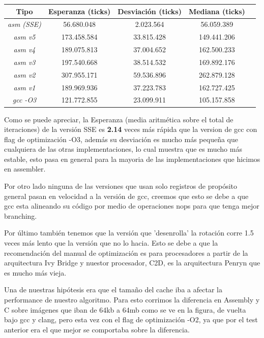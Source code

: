 \documentclass[a4paper]{article}
\begin{document}
\begin{center}
        \begin{tabular}[c]{|c|c|c|c|c|}
    \hline
        \textbf{Tipo} &  \textbf{Esperanza (ticks)} & \textbf{Desviación (ticks)} & \textbf{Mediana (ticks)}\\
        \hline
\textit{asm (SSE)} &    56.680.048  & 2.023.564 & 56.059.389\\
        \hline
\textit{asm v5} &   173.458.584    & 33.815.428 & 149.441.206\\
        \hline
\textit{asm v4} &   189.075.813    & 37.004.652 & 162.500.233 \\
        \hline
\textit{asm v3} &  197.540.668  & 38.514.532 & 169.892.176\\
        \hline
\textit{asm v2} &  307.955.171   & 59.536.896 & 262.879.128\\
        \hline
\textit{asm v1} &  189.969.936 & 37.223.783 & 162.727.425\\
        \hline
\textit{gcc -O3} &  121.772.855 & 23.099.911 & 105.157.858\\
        \hline
    \end{tabular}
\end{center}

Como se puede apreciar, la Esperanza (media aritmética sobre el total de iteraciones) de la versión SSE es \textbf{2.14} veces más rápida que la version de gcc con flag de optimización -O3, además su desviación es mucho más pequeña que cualquiera de las otras implementaciones, lo cual muestra que es mucho más estable, esto pasa en general para la mayoria de las implementaciones que hicimos en assembler.

Por otro lado ninguna de las versiones que usan solo registros de propósito general pasan en velocidad a la versión de gcc, creemos que esto se debe a que gcc esta alineando su código por medio de operaciones nops para que tenga mejor branching.

Por último también tenemos que la versión que 'desenrolla' la rotación corre 1.5 veces más lento que la versión que no lo hacia. Esto se debe a que la recomendación del manual de optimización es para procesadores a partir de la arquitectura Ivy Bridge y nuestor procesador, C2D, es la arquitectura Penryn que es mucho más vieja.
 \newline \hfill



Una de nuestras hipótesis era que el tamaño del cache iba a afectar la performance de nuestro algoritmo. Para esto corrimos la diferencia en Assembly y C sobre imágenes que iban de 64kb a 64mb como se ve en la figura, de vuelta bajo gcc y clang, pero esta vez con el flag de optimización -O2, ya que por el test anterior era el que mejor se comportaba sobre la diferencia. 
\end{document}
